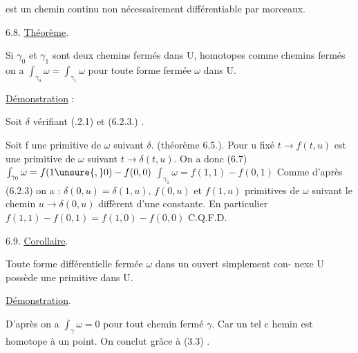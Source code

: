 
est un chemin continu non nécessairement différentiable par morceaux.

6.8. \uline{Théorème}.

Si $\gamma_0$ et $\gamma_1$ sont deux chemins fermés dans U, homotopes comme
chemins fermés on a $\int_{\gamma_0} \omega = \int_{\gamma_1} \omega$ pour toute forme fermée $\omega$ dans U.

\uline{Démonstration} :

Soit $\delta$ vérifiant (.2.1) et (6.2.3.) .

Soit f une primitive de $\omega$ suivant $\delta$. (théorème 6.5.). Pour u fixé
$t \to f(t,u)$ est une primitive de $\omega$ suivant $t \to \delta(t,u)$. On a donc (6.7)
$\int_{\gamma_0} \omega = f(1\unsure{,}0) - f(0,0)$
$\int_{\gamma_1} \omega = f(1,1) - f(0,1)$
Comme d'après (6.2.3) on a : $\delta(0,u) = \delta(1,u)$, $f(0,u)$ et $f(1,u)$ primitives
de $\omega$ suivant le chemin $u \to \delta(0,u)$ diffèrent d'une constante. En particulier
$f(1,1) - f(0,1) = f(1,0) - f(0,0)$ C.Q.F.D.

6.9. \uline{Corollaire}.

Toute forme différentielle fermée $\omega$ dans un ouvert simplement con-%
nexe U possède une primitive dans U.

\uline{Démonstration}.

D'après  on a $\int_{\gamma} \omega = 0$ pour tout chemin fermé $\gamma$. Car un
tel c hemin est homotope à un point. On conclut grâce à (3.3) .

